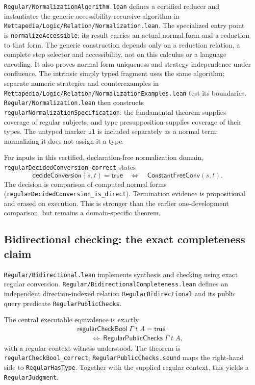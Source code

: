 \documentclass[11pt]{article}
\newcommand{\code}[1]{\nolinkurl{#1}}
\newcommand{\uO}{\mathsf{u1}}
\begin{document}
\code{Regular/NormalizationAlgorithm.lean} defines a certified reducer and
instantiates the generic accessibility-recursive algorithm in
\code{Mettapedia/Logic/Relation/Normalization.lean}.
The specialized entry point is \code{normalizeAccessible}; its result carries
an actual normal form and a reduction to that form. The generic construction
depends only on a reduction relation, a complete step selector and accessibility,
not on this calculus or a language encoding. It also proves normal-form uniqueness
and strategy independence under confluence. The intrinsic simply typed fragment
uses the same algorithm; separate numeric strategies and counterexamples in
\code{Mettapedia/Logic/Relation/NormalizationExamples.lean} test its boundaries.
\code{Regular/Normalization.lean} then constructs
\code{regularNormalizationSpecification}: the fundamental theorem supplies
coverage of regular subjects, and type presupposition supplies coverage of
their types. The untyped marker $\uO$ is included separately as a normal term;
normalizing it does not assign it a type.

For inputs in this certified, declaration-free normalization domain,
\code{regularDecidedConversion_correct} states
\[
  \mathsf{decideConversion}(s,t)=\mathsf{true}
    \quad\Longleftrightarrow\quad
  \mathsf{ConstantFreeConv}(s,t).
\]
The decision is comparison of computed normal forms
(\code{regularDecidedConversion_is_direct}). Termination evidence is
propositional and erased on execution. This is stronger than the earlier
one-development comparison, but remains a domain-specific theorem.

\subsection{Bidirectional checking: the exact completeness claim}

\code{Regular/Bidirectional.lean} implements synthesis and checking using
exact regular conversion.
\code{Regular/BidirectionalCompleteness.lean} defines an independent
direction-indexed relation \code{RegularBidirectional} and its public query
predicate \code{RegularPublicChecks}.

The central executable equivalence is exactly
\[
\begin{split}
 &\mathsf{regularCheckBool}\;\Gamma\;t\;A=\mathsf{true}\\
 &\hspace{2em}\Longleftrightarrow\
   \mathsf{RegularPublicChecks}\;\Gamma\;t\;A ,
\end{split}
\]
with a regular-context witness understood.
The theorem is \code{regularCheckBool_correct};
\code{RegularPublicChecks.sound} maps the right-hand side to
\code{RegularHasType}.
Together with the supplied regular context, this yields a
\code{RegularJudgment}.
\end{document}
